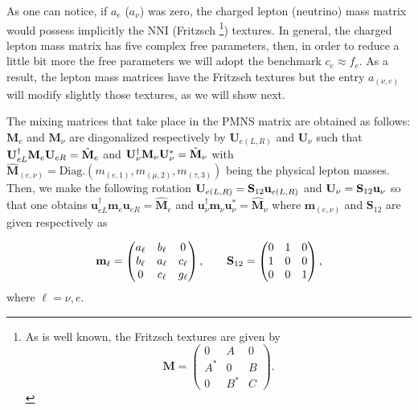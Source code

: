 \documentclass[aps,prd,groupaddress,floatfix,tighten,nofootinbib,showpacs,amsfonts,superscriptaddress]{revtex4-2}
\begin{document}
As one can notice, if $a_{e}$ ($a_{\nu}$) was zero, the charged lepton (neutrino) mass matrix  would possess implicitly the NNI (Fritzsch \footnote{ As is well known, the Fritzsch textures are given by
\begin{equation}
\mathbf{M}=\begin{pmatrix}
0 & A & 0 \\ 
A^{\ast} & 0 & B \\ 
0 & B^{\ast} & C
\end{pmatrix}.
\end{equation}
}) textures. In general, the charged lepton mass matrix has five complex free parameters, then, in order to reduce a little bit more the free parameters we will adopt the benchmark $c_{e}\approx f_{e}$. As a result, the lepton mass matrices have the Fritzsch textures but the entry $a_{(\nu, e)}$ will modify slightly those textures, as we will show next.





The mixing matrices that take place in the PMNS matrix are obtained as follows: $\mathbf{M}_{e}$ and $\mathbf{M}_{\nu}$ are diagonalized respectively by $\mathbf{U}_{e(L,R)}$ and $\mathbf{U}_{\nu}$ such that  
${\bf U}^{\dagger}_{e L} {\bf M}_{e}
{\bf U}_{e R}=\hat{\bf M}_{e}$ and  ${\bf U}^{\dagger}_{\nu} {\bf M}_{\nu}
{\bf U}^{\ast}_{\nu}=\hat{\bf M}_{\nu}$ with $\mathbf{\hat{M}}_{(e, \nu)}=\textrm{Diag.}(m_{(e,1)}, m_{(\mu, 2)}, m_{(\tau,3)})$ being the physical lepton masses. Then, we make the following rotation ${\bf U}_{e(L, R)}={\bf S}_{12} {\bf u}_{e(L,R)}$ and
${\bf U}_{\nu}={\bf S}_{12} {\bf u}_{\nu}$ 
so that one obtains $\mathbf{u}^{\dagger}_{e L} \mathbf{m}_{e}\mathbf{u}_{e R}=\mathbf{\hat{M}}_{e}$ 
and $\mathbf{u}^{\dagger}_{\nu} \mathbf{m}_{\nu}\mathbf{u}^{\ast}_{\nu }=\mathbf{\hat{M}}_{\nu}$  where  $\mathbf{m}_{(e,\nu)}$ and $\mathbf{S}_{12}$ are given respectively as

\begin{equation}
{\bf m}_{\ell}=\begin{pmatrix}
a_{\ell} & b_{\ell} & 0 \\ 
b_{\ell} & a_{\ell} & c_{\ell} \\ 
0 & c_{\ell} & g_{\ell}
\end{pmatrix},\qquad \mathbf{S}_{12}= \begin{pmatrix}
0 & 1 & 0 \\ 
1 & 0 & 0 \\ 
0 & 0 & 1
\end{pmatrix},
\end{equation}
where $\ell=\nu, e$. 
\end{document}
